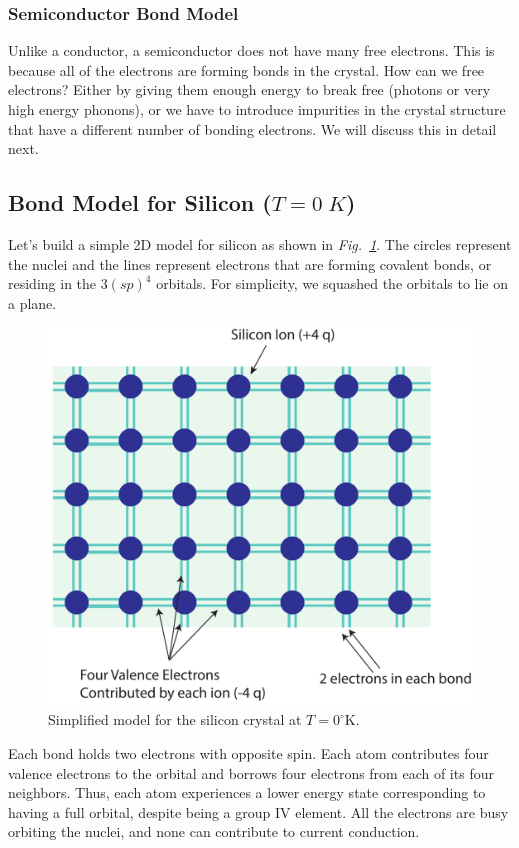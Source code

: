 \subsubsection{Semiconductor Bond Model}
Unlike a conductor, a semiconductor does not have many free electrons.  This is because all of the electrons are forming bonds in the crystal.  How can we free electrons?  Either by giving them enough energy to break free (photons or very high energy phonons), or we have to introduce impurities in the crystal structure that have a different number of bonding electrons.  We will discuss this in detail next.
\subsection{Bond Model for Silicon (\texorpdfstring{$T=0\;K$}{T=0K})}
Let's build a simple 2D model for silicon as shown in \emph{Fig.~\ref{fig:silicon_model}}.  The circles represent the nuclei and the lines represent electrons that are forming covalent bonds, or residing in the $3(sp)^4$ orbitals.  For simplicity, we squashed the orbitals to lie on a plane.
\begin{figure}[tb]
\centering
\includegraphics[width=.65\columnwidth]{silicon_model}
\caption{Simplified model for the  silicon crystal at $T=0^\circ$K.}
\label{fig:silicon_model}
\end{figure}

Each bond holds two electrons with opposite spin.  Each atom contributes four valence electrons to the orbital and borrows four electrons from each of its four neighbors.  Thus, each atom experiences a lower energy state corresponding to having a full orbital, despite being a group IV element.  All the electrons are busy orbiting the nuclei, and none can contribute to current conduction.
